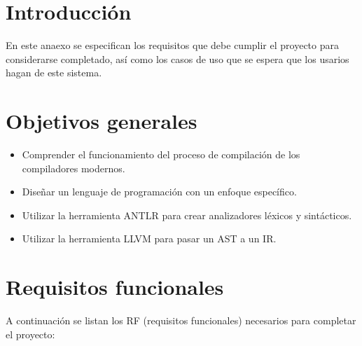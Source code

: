 
\section{Introducción}

En este anaexo se especifican los requisitos que debe cumplir el proyecto para considerarse completado, así como los casos de uso que se espera que los usarios hagan de este sistema.

\section{Objetivos generales}
\begin{itemize}
  \item Comprender el funcionamiento del proceso de compilación de los compiladores modernos.
  \item Diseñar un lenguaje de programación con un enfoque específico.
  \item Utilizar la herramienta ANTLR para crear analizadores léxicos y sintácticos.
  \item Utilizar la herramienta LLVM para pasar un AST a un IR.
\end{itemize}

\section{Requisitos funcionales}
A continuación se listan los RF (requisitos funcionales) necesarios para completar el proyecto:

